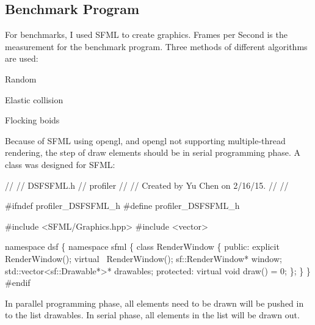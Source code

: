 \hypertarget{_conformanceto_specificationand_design_manual_ImplementationBenchmarkProgram}{}\subsection{Benchmark Program}\label{_conformanceto_specificationand_design_manual_ImplementationBenchmarkProgram}
For benchmarks, I used S\+F\+M\+L to create graphics. Frames per Second is the measurement for the benchmark program. Three methods of different algorithms are used\+:
\begin{DoxyItemize}
\item Random
\item Elastic collision
\item Flocking boids
\end{DoxyItemize}

Because of S\+F\+M\+L using opengl, and opengl not supporting multiple-\/thread rendering, the step of draw elements should be in serial programming phase. A class was designed for S\+F\+M\+L\+: 
\begin{DoxyCodeInclude}
\textcolor{comment}{//}
\textcolor{comment}{//  DSFSFML.h}
\textcolor{comment}{//  profiler}
\textcolor{comment}{//}
\textcolor{comment}{//  Created by Yu Chen on 2/16/15.}
\textcolor{comment}{//}
\textcolor{comment}{//}

\textcolor{preprocessor}{#ifndef profiler\_DSFSFML\_h}
\textcolor{preprocessor}{#define profiler\_DSFSFML\_h}

\textcolor{preprocessor}{#include <SFML/Graphics.hpp>}
\textcolor{preprocessor}{#include <vector>}

\textcolor{keyword}{namespace }dsf
\{
    \textcolor{keyword}{namespace }sfml
    \{
        \textcolor{keyword}{class }RenderWindow
        \{
        \textcolor{keyword}{public}:
            \textcolor{keyword}{explicit} RenderWindow();
            \textcolor{keyword}{virtual} ~RenderWindow();
            sf::RenderWindow* window;
            std::vector<sf::Drawable*>* drawables;
        \textcolor{keyword}{protected}:
            \textcolor{keyword}{virtual} \textcolor{keywordtype}{void} draw() = 0;
        \};
    \}
\}
\textcolor{preprocessor}{#endif}
\end{DoxyCodeInclude}
 In parallel programming phase, all elements need to be drawn will be pushed in to the list drawables. In serial phase, all elements in the list will be drawn out. 